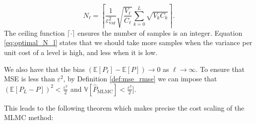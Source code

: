 \begin{equation}\label{eq:optimal_N_l}
    N_\ell = \left\lceil \frac{1}{\varepsilon_{\text{var}}^2} \sqrt{\frac{V_\ell}{C_\ell}} \sum_{k=0}^L \sqrt{V_k C_k} \right\rceil.
\end{equation}
The ceiling function $\lceil \cdot \rceil$ ensures the number of samples is an integer.
Equation \eqref{eq:optimal_N_l} states that we should take more samples when the 
variance per unit cost of a level is high, and less when it is low.


We also have that the bias $(\mathbb{E}[P_\ell] - \mathbb{E}[P]) \to 0$ as $\ell \to \infty$. 
To ensure that MSE is less than $\varepsilon^2$, by Definition \ref{def:mse_rmse} we can 
impose that 
$(\mathbb{E}[P_L  - P])^2 < \frac{\varepsilon^2}{2}$ and 
$\mathbb{V}[\hat{P}_{\mathrm{MLMC}}] < \frac{\varepsilon^2}{2}]$. 

This leads to the following theorem \cite{giles2015multilevel} which makes 
precise the cost scaling of the MLMC method:

